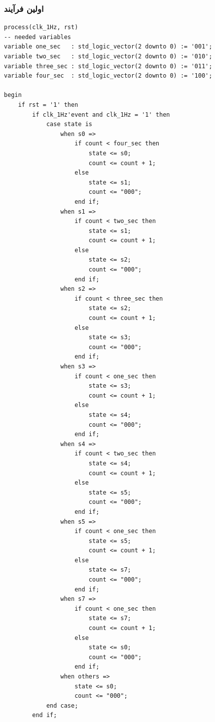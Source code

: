 \documentclass[dvipsnames, svgnames, x11names, a4paper, 11pt]{article}
\begin{document}
\subsubsection{اولین فرآیند}
\begin{latin}
\begin{lstlisting}[firstnumber=29]
process(clk_1Hz, rst)
-- needed variables
variable one_sec   : std_logic_vector(2 downto 0) := '001';
variable two_sec   : std_logic_vector(2 downto 0) := '010';
variable three_sec : std_logic_vector(2 downto 0) := '011';
variable four_sec  : std_logic_vector(2 downto 0) := '100';

begin
	if rst = '1' then
        if clk_1Hz'event and clk_1Hz = '1' then
            case state is
                when s0 =>
                    if count < four_sec then
                        state <= s0;
                        count <= count + 1;
                    else
                        state <= s1;
                        count <= "000";
                    end if;
                when s1 =>
                    if count < two_sec then
                        state <= s1;
                        count <= count + 1;
                    else
                        state <= s2;
                        count <= "000";
                    end if;
                when s2 =>
                    if count < three_sec then
                        state <= s2;
                        count <= count + 1;
                    else
                        state <= s3;
                        count <= "000";
                    end if;
                when s3 =>
                    if count < one_sec then
                        state <= s3;
                        count <= count + 1;
                    else
                        state <= s4;
                        count <= "000";
                    end if;
                when s4 =>
                    if count < two_sec then
                        state <= s4;
                        count <= count + 1;
                    else
                        state <= s5;
                        count <= "000";
                    end if;
                when s5 =>
                    if count < one_sec then
                        state <= s5;
                        count <= count + 1;
                    else
                        state <= s7;
                        count <= "000";
                    end if;
                when s7 =>
                    if count < one_sec then
                        state <= s7;
                        count <= count + 1;
                    else
                        state <= s0;
                        count <= "000";
                    end if;
                when others =>
                    state <= s0;
                    count <= "000";
            end case;
        end if;
\end{lstlisting}
\end{latin}
\end{document}
